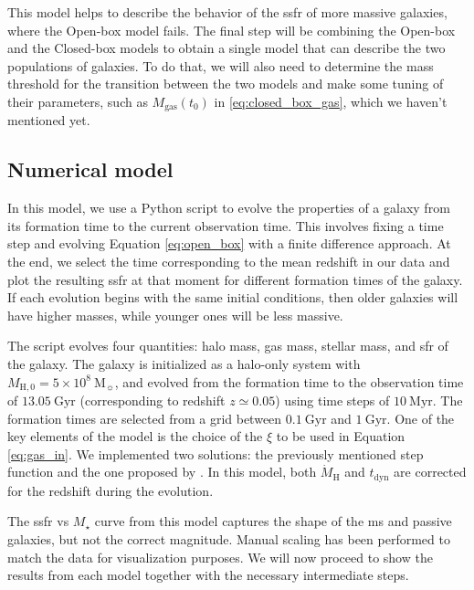 \documentclass[fleqn, usenatbib]{mnras}
\begin{document}
This model helps to describe the behavior of the \acrshort{ssfr} of more massive galaxies, where the Open-box model fails. The final step will be combining the Open-box and the Closed-box models to obtain a single model that can describe the two populations of galaxies. To do that, we will also need to determine the mass threshold for the transition between the two models and make some tuning of their parameters, such as \(M_{\mathrm{gas}}(t_0)\) in \eqref{eq:closed_box_gas}, which we haven't mentioned yet.

\subsection{Numerical model}

In this model, we use a Python script to evolve the properties of a galaxy from its formation time to the current observation time. This involves fixing a time step and evolving Equation \ref{eq:open_box} with a finite difference approach. At the end, we select the time corresponding to the mean redshift in our data and plot the resulting \acrshort{ssfr} at that moment for different formation times of the galaxy. If each evolution begins with the same initial conditions, then older galaxies will have higher masses, while younger ones will be less massive.

The script evolves four quantities: halo mass, gas mass, stellar mass, and \acrlong{sfr} of the galaxy. The galaxy is initialized as a halo-only system with \(M_{\mathrm{H, 0}} = 5 \times 10^8\ \mathrm{M_{\sun}}\), and evolved from the formation time to the observation time of \(13.05\ \mathrm{Gyr}\) (corresponding to redshift \(z \simeq 0.05\)) using time steps of \(10\ \mathrm{Myr}\). The formation times are selected from a grid between \(0.1\ \mathrm{Gyr}\) and \(1\ \mathrm{Gyr}\). One of the key elements of the model is the choice of the \(\xi\) to be used in Equation \ref{eq:gas_in}. We implemented two solutions: the previously mentioned step function and the one proposed by \citet{Dave2011}. In this model, both \(\dot{M}_{\mathrm{H}}\) and \(t_{\mathrm{dyn}}\) are corrected for the redshift during the evolution.

The \acrshort{ssfr} vs \(M_{\star}\) curve from this model captures the shape of the \acrlong{ms} and passive galaxies, but not the correct magnitude. Manual scaling has been performed to match the data for visualization purposes. We will now proceed to show the results from each model together with the necessary intermediate steps.
\end{document}

